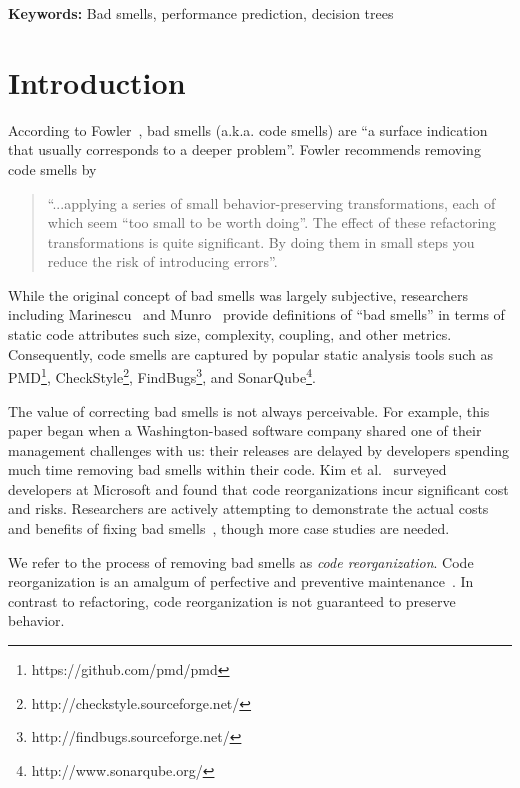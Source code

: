 \documentclass[twocolumn,5p]{elsarticle}
\theoremstyle{break}
\begin{document}
	
	\vspace{1mm}
	\noindent
	{\bf Keywords:} Bad smells,
	performance prediction,  decision trees 
	
	
	
	
	\section{Introduction}
	
	According to   Fowler~\cite{fowler99}, bad smells (a.k.a. code smells)
	are ``a surface indication that usually corresponds to a deeper problem''.
	Fowler  recommends   removing   code smells   by
	\begin{quote}
		``...applying a series of small behavior-preserving transformations, each 
		of which seem ``too small to be worth doing''. 
		The  effect of   these refactoring transformations is quite significant. By doing them in small steps you reduce the risk 
		of introducing errors''.
	\end{quote}
	
	While the original concept of bad smells was largely subjective, researchers including Marinescu~\cite{marinescu06} and Munro~\cite{munro2005product} provide definitions of ``bad smells'' in terms of static code attributes such size, complexity, coupling, and other metrics. Consequently, code smells are captured by popular static analysis tools such as PMD\footnote{https://github.com/pmd/pmd}, CheckStyle\footnote{http://checkstyle.sourceforge.net/}, FindBugs\footnote{http://findbugs.sourceforge.net/}, and SonarQube\footnote{http://www.sonarqube.org/}. 

	
	The value of correcting bad smells is not always perceivable. For example, this paper began when a Washington-based software company shared one of their management challenges with us: their  releases are delayed by developers spending  much time removing bad smells within their code. Kim et al.~\cite{kim2012field} surveyed developers at Microsoft and found that code reorganizations incur significant cost and risks. Researchers are actively attempting to demonstrate the actual costs and benefits of fixing bad smells~\cite{nugroho2011empirical,zazworka2011prioritizing,zazworka2013case}, though more case studies are needed.
	
			We refer to the process of removing bad smells as \textit{code reorganization}. Code reorganization is an amalgum of perfective and preventive maintenance~\cite{iso14764}. In contrast to refactoring, code reorganization is not guaranteed to preserve behavior.
			
\end{document}
